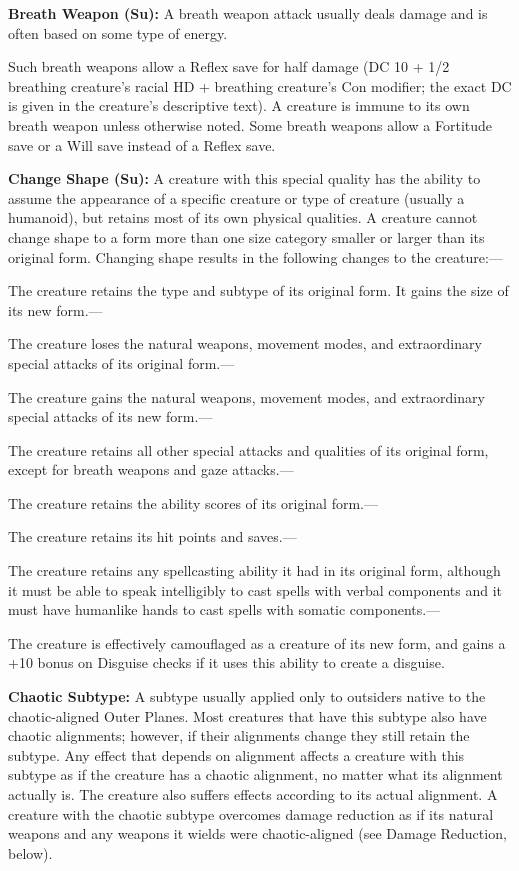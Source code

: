 \documentclass{article}
\begin{document}
\vspace{12pt}
\textbf{Breath Weapon (Su): }A breath weapon attack usually deals damage and is 
often based on some type of energy.

Such breath weapons allow a Reflex save for half damage (DC 10 + 1/2 breathing 
creature's racial HD + breathing creature's Con modifier; the exact DC is given 
in the creature's descriptive text). A creature is immune to its own breath weapon 
unless otherwise noted. Some breath weapons allow a Fortitude save or a Will save 
instead of a Reflex save.

\vspace{12pt}
\textbf{Change Shape (Su):} A creature with this special quality has the ability 
to assume the appearance of a specific creature or type of creature (usually a 
humanoid), but retains most of its own physical qualities. A creature cannot change 
shape to a form more than one size category smaller or larger than its original 
form. Changing shape results in the following changes to the creature:---

The creature retains the type and subtype of its original form. It gains the size 
of its new form.---

The creature loses the natural weapons, movement modes, and extraordinary special 
attacks of its original form.---

The creature gains the natural weapons, movement modes, and extraordinary special 
attacks of its new form.---

The creature retains all other special attacks and qualities of its original form, 
except for breath weapons and gaze attacks.---

The creature retains the ability scores of its original form.---

The creature retains its hit points and saves.---

The creature retains any spellcasting ability it had in its original form, although 
it must be able to speak intelligibly to cast spells with verbal components and 
it must have humanlike hands to cast spells with somatic components.---

The creature is effectively camouflaged as a creature of its new form, and gains 
a +10 bonus on Disguise checks if it uses this ability to create a disguise.

\vspace{12pt}
\textbf{Chaotic Subtype: }A subtype usually applied only to outsiders native to 
the chaotic-aligned Outer Planes. Most creatures that have this subtype also have 
chaotic alignments; however, if their alignments change they still retain the subtype. 
Any effect that depends on alignment affects a creature with this subtype as if 
the creature has a chaotic alignment, no matter what its alignment actually is. 
The creature also suffers effects according to its actual alignment. A creature 
with the chaotic subtype overcomes damage reduction as if its natural weapons and 
any weapons it wields were chaotic-aligned (see Damage Reduction, below).
\end{document}
